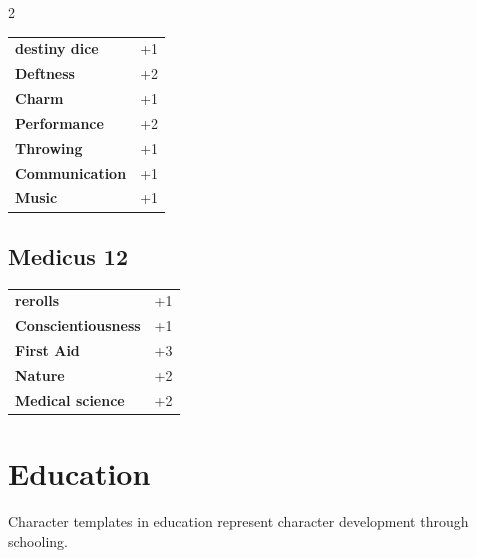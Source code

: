 \begin{multicols}{2}
\begin{tcolorbox}
\begin{tabular}{@{}ll@{}}
    \textbf{destiny dice} & +1\\
    \textbf{Deftness} & +2\\
    \textbf{Charm} & +1\\
    \textbf{Performance} & +2\\
    \textbf{Throwing} & +1\\
    \textbf{Communication} & +1\\
    \textbf{Music} & +1\\
\end{tabular}


\end{tcolorbox}

\begin{tcolorbox}
    \subsection*{Medicus \hfill \small{12 }}
    \tcblower




\begin{tabular}{@{}ll@{}}
    \textbf{rerolls} & +1\\
    \textbf{Conscientiousness} & +1\\
    \textbf{First Aid} & +3\\
    \textbf{Nature} & +2\\
    \textbf{Medical science} & +2\\
\end{tabular}


\end{tcolorbox}

\section{Education}

Character templates in education represent character development through schooling.

\begin{tcolorbox}

\end{tcolorbox}
\end{multicols}
